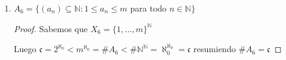 \documentclass[12pt]{article}
\newcommand{\n}{\aleph_{0}}
\newcommand{\Q}{\mathbb{Q}}
\newcommand{\N}{\mathbb{N}}
\theoremstyle{definition}
\begin{document}
\begin{enumerate}
\begin{proof}
      Entonces $\# P_{k} = \# \Q^{k} = \# \N^{k} = \n$

      Y luego tenemos que $$ A_{5} = \bigcup_{k \in \N} P_{k}$$

      Luego $A_{5}$ es unión numerable de numerable $\# A_{5} = \n$


    \end{proof} 
  \item $A_{6} = \{(a_{n}) \subseteq \N : 1 \leq a_{n} \leq m$ para todo $ n \in \N\}$
    \begin{proof}
      Sabemos que $X_{6} = \{1, \dots , m\}^{\N}$ 

      Luego $\mathfrak{c} = 2^{\n} < m^{\n} = \# A_{6} < \# \N^{\N} = \n^{\n} = \mathfrak{c}$ resumiendo $\# A_{6} = \mathfrak{c}$
    \end{proof} 

\end{enumerate}
\end{document}
